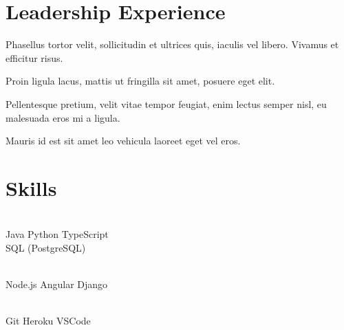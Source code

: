 \documentclass[]{resume}
\begin{document}

\section{Leadership Experience} 

\begin{tightemize}
    \item Phasellus tortor velit, sollicitudin et ultrices quis, iaculis vel libero. Vivamus et efficitur risus. 
    \item Proin ligula lacus, mattis ut fringilla sit amet, posuere eget elit.
\end{tightemize}
\sectionsep

\begin{tightemize}
    \item Pellentesque pretium, velit vitae tempor feugiat, enim lectus semper nisl, eu malesuada eros mi a ligula.
    \item Mauris id est sit amet leo vehicula laoreet eget vel eros.
\end{tightemize}
\sectionsep


\section{Skills}

\begin{minipage}[t]{0.3\textwidth} 
    \sectionsep \\
    Java \textbullet{} Python \textbullet{} TypeScript \textbullet{} \\
    SQL (PostgreSQL)
\end{minipage}
\hfill\vline\hfill
\begin{minipage}[t]{0.3\textwidth} 
    \sectionsep \\
    Node.js \textbullet{} Angular \textbullet{} Django
\end{minipage}
\hfill\vline\hfill
\begin{minipage}[t]{0.3\textwidth} 
    \sectionsep \\
    Git \textbullet{} Heroku \textbullet{} VSCode
\end{minipage}
\end{document}
